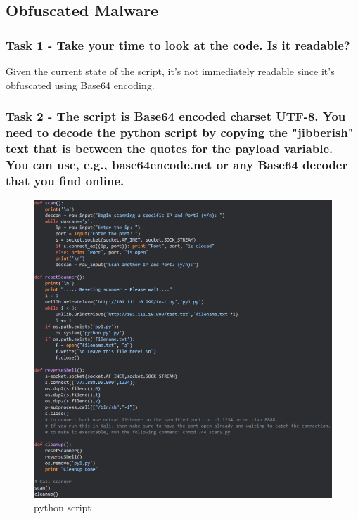 \subsection{Obfuscated Malware}

\subsubsection{Task 1 - Take your time to look at the code. Is it readable?}
Given the current state of the script, it's not immediately readable since it's obfuscated using
Base64 encoding.

\subsubsection{Task 2 - The script is Base64 encoded charset UTF-8. You need to decode the
    python script by copying the "jibberish" text that is between the quotes for the
    payload variable. You can use, e.g., base64encode.net or any Base64 decoder
    that you find online.}

\begin{figure}[H]
    \centering
    \includegraphics[width=0.9\linewidth]{pic/python script.png}
    \caption{python script}
    \label{fig:python script}
\end{figure}


